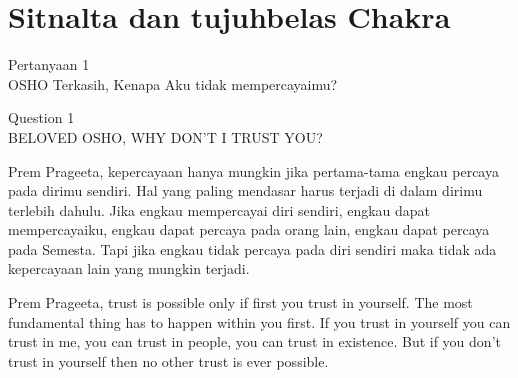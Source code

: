 \chapter{Sitnalta dan tujuhbelas Chakra}

\bahasa
Pertanyaan 1\\
OSHO Terkasih, Kenapa Aku tidak mempercayaimu?

\english
Question 1\\
BELOVED OSHO, WHY DON'T I TRUST YOU?

\bahasa
Prem Prageeta, kepercayaan hanya mungkin jika pertama-tama engkau percaya pada dirimu sendiri. Hal yang paling mendasar harus terjadi di dalam dirimu terlebih dahulu. Jika engkau mempercayai diri sendiri, engkau dapat mempercayaiku, engkau dapat percaya pada orang lain, engkau dapat percaya pada Semesta. Tapi jika engkau tidak percaya pada diri sendiri maka tidak ada kepercayaan lain yang mungkin terjadi.

\english
Prem Prageeta, trust is possible only if first you trust in yourself. The most fundamental thing has to happen within you first. If you trust in yourself you can trust in me, you can trust in people, you can trust in existence. But if you don't trust in yourself then no other trust is ever possible.

\bahasa




